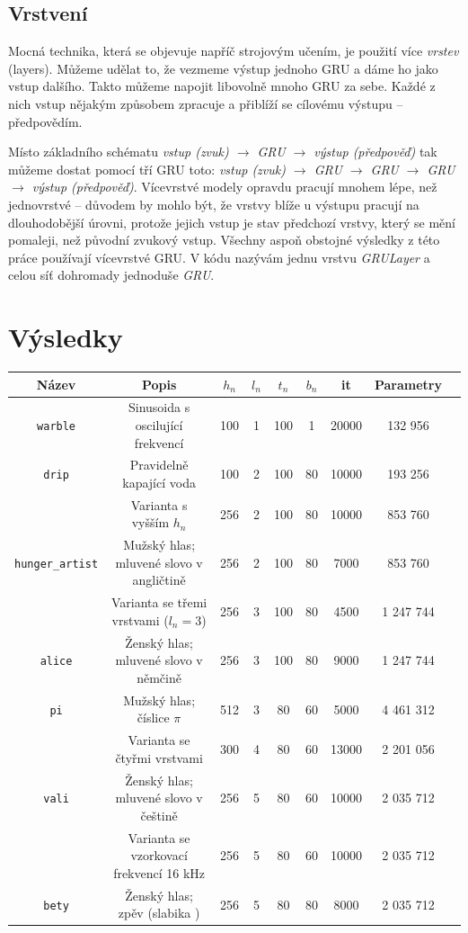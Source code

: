 \documentclass[a4]{article}
\begin{document}
\subsection{Vrstvení}
Mocná technika, která se objevuje napříč strojovým učením, je použití více \textit{vrstev} (layers). Můžeme udělat to, že vezmeme výstup jednoho GRU a dáme ho jako vstup dalšího. Takto můžeme napojit libovolně mnoho GRU za sebe. Každé z nich vstup nějakým způsobem zpracuje a přiblíží se cílovému výstupu -- předpovědím.

Místo základního schématu \textit{vstup (zvuk) $\rightarrow$ GRU $\rightarrow$ výstup (předpověď)} tak můžeme dostat pomocí tří GRU toto: \textit{vstup (zvuk) $\rightarrow$ GRU $\rightarrow$ GRU $\rightarrow$ GRU $\rightarrow$ výstup (předpověď)}. Vícevrstvé modely opravdu pracují mnohem lépe, než jednovrstvé -- důvodem by mohlo být, že vrstvy blíže u výstupu pracují na dlouhodobější úrovni, protože jejich vstup je stav předchozí vrstvy, který se mění pomaleji, než původní zvukový vstup. Všechny aspoň obstojné výsledky z této práce používají vícevrstvé GRU. V kódu nazývám jednu vrstvu \textit{GRULayer} a celou síť dohromady jednoduše \textit{GRU}.

\section{Výsledky}
\begin{center}
\begin{tabular}{ |c|c|c|c|c|c|c|c|c| }
\hline
Název 					& Popis 									&$h_n$&$l_n$&$t_n$&$b_n$& it & Parametry\\ \hline \hline
\verb|warble| 			& Sinusoida s oscilující frekvencí 		& 100 & 1 & 100 & 1  & 20000 &   132 956 \\ \hline
\verb|drip| 			& Pravidelně kapající voda 					& 100 & 2 & 100 & 80 & 10000 &   193 256 \\
\						& Varianta s vyšším $h_n$ 					& 256 & 2 & 100 & 80 & 10000 &   853 760 \\ \hline
\verb|hunger_artist|	& Mužský hlas; mluvené slovo v angličtině 	& 256 & 2 & 100 & 80 & 7000  &   853 760 \\
						& Varianta se třemi vrstvami ($l_n=3$) 	& 256 & 3 & 100 & 80 & 4500  & 1 247 744 \\ \hline
\verb|alice| 			& Ženský hlas; mluvené slovo v němčině 	& 256 & 3 & 100 & 80 & 9000  & 1 247 744 \\ \hline
\verb|pi| 				& Mužský hlas; číslice $\pi$ 				& 512 & 3 & 80  & 60 & 5000  & 4 461 312 \\
						& Varianta se čtyřmi vrstvami				& 300 & 4 & 80  & 60 & 13000 & 2 201 056 \\ \hline
\verb|vali| 			& Ženský hlas; mluvené slovo v češtině 	& 256 & 5 & 80  & 60 & 10000 & 2 035 712 \\ 
						& Varianta se vzorkovací frekvencí 16 kHz 	& 256 & 5 & 80  & 60 & 10000 & 2 035 712 \\ \hline
\verb|bety| 			& Ženský hlas; zpěv (slabika \uv{ma}) 		& 256 & 5 & 80  & 80 & 8000  & 2 035 712 \\ \hline
\end{tabular}
\end{center}
\end{document}
